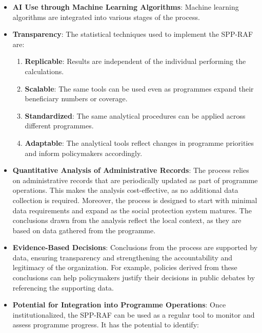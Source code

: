 \documentclass[
]{article}
\providecommand{\tightlist}{%
  \setlength{\itemsep}{0pt}\setlength{\parskip}{0pt}}
\begin{document}
\begin{itemize}
\item
  \textbf{AI Use through Machine Learning Algorithms}: Machine learning
  algorithms are integrated into various stages of the process.
\item
  \textbf{Transparency}: The statistical techniques used to implement
  the SPP-RAF are:\\

  \begin{enumerate}
  \def\labelenumi{\alph{enumi}.}
  \tightlist
  \item
    \textbf{Replicable}: Results are independent of the individual
    performing the calculations.\\
  \item
    \textbf{Scalable}: The same tools can be used even as programmes
    expand their beneficiary numbers or coverage.\\
  \item
    \textbf{Standardized}: The same analytical procedures can be applied
    across different programmes.\\
  \item
    \textbf{Adaptable}: The analytical tools reflect changes in
    programme priorities and inform policymakers accordingly.
  \end{enumerate}
\item
  \textbf{Quantitative Analysis of Administrative Records}: The process
  relies on administrative records that are periodically updated as part
  of programme operations. This makes the analysis cost-effective, as no
  additional data collection is required. Moreover, the process is
  designed to start with minimal data requirements and expand as the
  social protection system matures. The conclusions drawn from the
  analysis reflect the local context, as they are based on data gathered
  from the programme.
\item
  \textbf{Evidence-Based Decisions}: Conclusions from the process are
  supported by data, ensuring transparency and strengthening the
  accountability and legitimacy of the organization. For example,
  policies derived from these conclusions can help policymakers justify
  their decisions in public debates by referencing the supporting data.
\item
  \textbf{Potential for Integration into Programme Operations}: Once
  institutionalized, the SPP-RAF can be used as a regular tool to
  monitor and assess programme progress. It has the potential to
  identify:\\


\end{itemize}
\end{document}
